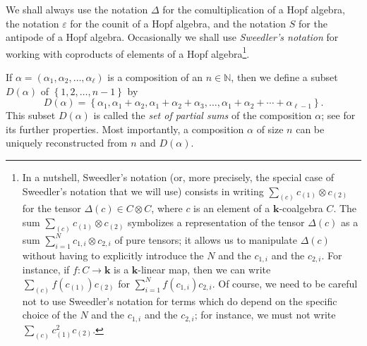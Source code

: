 \documentclass
[numbers=enddot,12pt,final,onecolumn,notitlepage,abstracton]{scrartcl}%
\theoremstyle{definition}
\let\sumnonlimits\sum
\renewcommand{\sum}{\sumnonlimits\limits}
\begin{document}
We shall always use the notation $\Delta$ for the comultiplication of a Hopf
algebra, the notation $\varepsilon$ for the counit of a Hopf algebra, and the
notation $S$ for the antipode of a Hopf algebra. Occasionally we shall use
\textit{Sweedler's notation} for working with coproducts of elements of a Hopf
algebra\footnote{In a nutshell, Sweedler's notation (or, more precisely, the
special case of Sweedler's notation that we will use) consists in writing
$\sum_{\left(  c\right)  }c_{\left(  1\right)  }\otimes c_{\left(  2\right)
}$ for the tensor $\Delta\left(  c\right)  \in C\otimes C$, where $c$ is an
element of a $\mathbf{k}$-coalgebra $C$. The sum $\sum_{\left(  c\right)
}c_{\left(  1\right)  }\otimes c_{\left(  2\right)  }$ symbolizes a
representation of the tensor $\Delta\left(  c\right)  $ as a sum $\sum
_{i=1}^{N}c_{1,i}\otimes c_{2,i}$ of pure tensors; it allows us to manipulate
$\Delta\left(  c\right)  $ without having to explicitly introduce the $N$ and
the $c_{1,i}$ and the $c_{2,i}$. For instance, if $f:C\rightarrow\mathbf{k}$
is a $\mathbf{k}$-linear map, then we can write $\sum_{\left(  c\right)
}f\left(  c_{\left(  1\right)  }\right)  c_{\left(  2\right)  }$ for
$\sum_{i=1}^{N}f\left(  c_{1,i}\right)  c_{2,i}$. Of course, we need to be
careful not to use Sweedler's notation for terms which do depend on the
specific choice of the $N$ and the $c_{1,i}$ and the $c_{2,i}$; for instance,
we must not write $\sum_{\left(  c\right)  }c_{\left(  1\right)  }%
^{2}c_{\left(  2\right)  }$.}.

If $\alpha=\left(  \alpha_{1},\alpha_{2},\ldots,\alpha_{\ell}\right)  $ is a
composition of an $n\in\mathbb{N}$, then we define a subset $D\left(
\alpha\right)  $ of $\left\{  1,2,\ldots,n-1\right\}  $ by%
\[
D\left(  \alpha\right)  =\left\{  \alpha_{1},\alpha_{1}+\alpha_{2},\alpha
_{1}+\alpha_{2}+\alpha_{3},\ldots,\alpha_{1}+\alpha_{2}+\cdots+\alpha_{\ell
-1}\right\}  .
\]
This subset $D\left(  \alpha\right)  $ is called the \textit{set of partial
sums} of the composition $\alpha$; see \cite[Definition 5.1.10]{Reiner} for
its further properties. Most importantly, a composition $\alpha$ of size $n$
can be uniquely reconstructed from $n$ and $D\left(  \alpha\right)  $.
\end{document}
